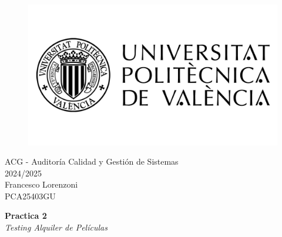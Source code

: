 \begin{titlepage}
   \begin{figure}
      \vspace{50mm}
       \centering
       \includegraphics[keepaspectratio=true,width=0.40\columnwidth]{images/upvLogo.png}
   \end{figure}
   
   \vspace{40mm}
   \begin{center}
       \LARGE{ACG - Auditoría Calidad y Gestión de Sistemas}
       \vspace{2.5mm}
       \\ \large{2024/2025}
       \vspace{5mm}
       \\ \large{Francesco Lorenzoni\\\textsc{PCA25403GU}}
   \end{center}
   
   \begin{center}
      \vspace{10mm}
       {\LARGE{\textbf{Practica 2}\\ \vspace{5mm}
       \textit{Testing Alquiler de Películas}}}
       
   \end{center}
\end{titlepage}